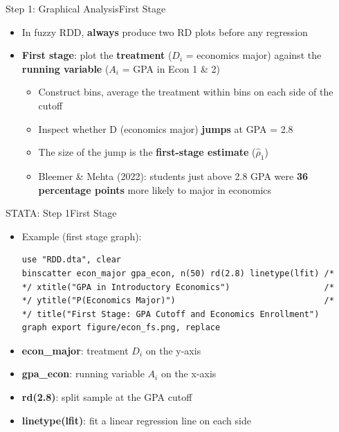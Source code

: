 \documentclass[hyperref={pdfpagelabels=false}]{beamer}
\begin{document}
\begin{frame}{Step 1: Graphical Analysis}{First Stage}
	\begin{itemize}
		\item In fuzzy RDD, \textbf{always} produce two RD plots before any regression
		\vspace{0.2cm}
		\item \textbf{First stage}: plot the \textbf{treatment} ($D_i$ = economics major)
		against the \textbf{running variable} ($A_i$ = GPA in Econ 1 \& 2)
		\vspace{0.2cm}
		\begin{itemize}
			\item Construct bins, average the treatment within bins on each side of the cutoff
			\vspace{0.2cm}
			\item Inspect whether D (economics major) \textbf{jumps} at GPA = 2.8
			\vspace{0.2cm}
			\item The size of the jump is the \textbf{first-stage estimate} ($\hat{\rho}_1$)
			\vspace{0.2cm}
			\item Bleemer \& Mehta (2022): students just above 2.8 GPA were
			\textbf{36 percentage points} more likely to major in economics
		\end{itemize}
	\end{itemize}
\end{frame}


\begin{frame}[fragile]{STATA: Step 1}{First Stage}
	\begin{itemize}
		\item Example (first stage graph):
\begin{lstlisting}
use "RDD.dta", clear
binscatter econ_major gpa_econ, n(50) rd(2.8) linetype(lfit) /*
*/ xtitle("GPA in Introductory Economics")                   /*
*/ ytitle("P(Economics Major)")                              /*
*/ title("First Stage: GPA Cutoff and Economics Enrollment")
graph export figure/econ_fs.png, replace
\end{lstlisting}
		\vspace{0.2cm}
		\item \textbf{econ\_major}: treatment $D_i$ on the y-axis
		\vspace{0.2cm}
		\item \textbf{gpa\_econ}: running variable $A_i$ on the x-axis
		\vspace{0.2cm}
		\item \textbf{rd(2.8)}: split sample at the GPA cutoff
		\vspace{0.2cm}
		\item \textbf{linetype(lfit)}: fit a linear regression line on each side
	\end{itemize}
\end{frame}
\end{document}
